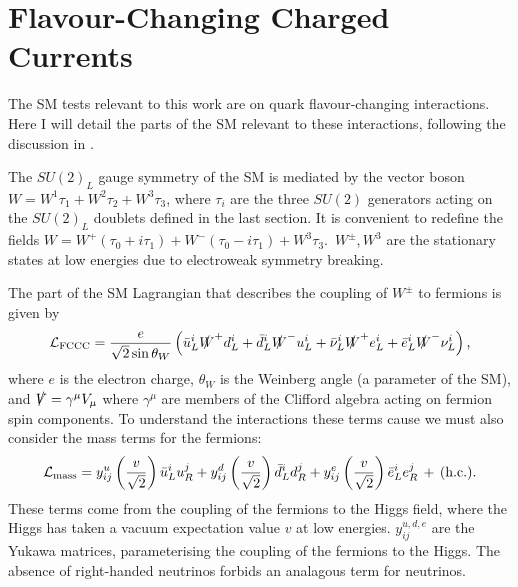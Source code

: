 \section{Flavour-Changing Charged Currents}
\label{sec:fccc}

The SM tests relevant to this work are on quark flavour-changing interactions. Here I will detail the parts of the SM relevant to these interactions, following the discussion in \cite{Schwartz:2013pla}.

The $SU(2)_L$ gauge symmetry of the SM is mediated by the vector boson $W=W^1\tau_1 + W^2\tau_2 + W^3\tau_3$, where $\tau_i$ are the three $SU(2)$ generators acting on the $SU(2)_L$ doublets defined in the last section. It is convenient to redefine the fields $W = W^+ ( \tau_0 + i\tau_1 ) + W^- ( \tau_0 - i\tau_1 ) + W^3 \tau_3$.\, $W^{\pm},W^3$ are the stationary states at low energies due to electroweak symmetry breaking.

The part of the SM Lagrangian that describes the coupling of $W^{\pm}$ to fermions is given by
\begin{align}
  \mathcal{L}_{\text{FCCC}} = {e\over \sqrt{2}\sin\theta_W} \left( \bar{u}_L^i \slashed{W}^+ d_L^i + \bar{d}_L^i \slashed{W}^- u_L^i + \bar{\nu}_L^i \slashed{W}^+ e_L^i + \bar{e}_L^i \slashed{W}^- \nu_L^i \right),
  \label{eq:FCCC}
\end{align}
where $e$ is the electron charge, $\theta_W$ is the Weinberg angle (a parameter of the SM), and $\slashed{V} = \gamma^{\mu} V_{\mu}$ where $\gamma^{\mu}$ are members of the Clifford algebra acting on fermion spin components. To understand the interactions these terms cause we must also consider the mass terms for the fermions:
\begin{align}
  \mathcal{L}_{\text{mass}} = y_{ij}^u \left({v\over \sqrt{2}}\right) \bar{u}_L^i u_R^j + y_{ij}^d \left({v\over \sqrt{2}}\right) \bar{d}_L^i d_R^j + y_{ij}^e \left({v\over \sqrt{2}}\right) \bar{e}_L^i e_R^j \,+\,(\text{h.c.}).
\end{align}
These terms come from the coupling of the fermions to the Higgs field, where the Higgs has taken a vacuum expectation value $v$ at low energies. $y^{u,d,e}_{ij}$ are the Yukawa matrices, parameterising the coupling of the fermions to the Higgs. The absence of right-handed neutrinos forbids an analagous term for neutrinos.

